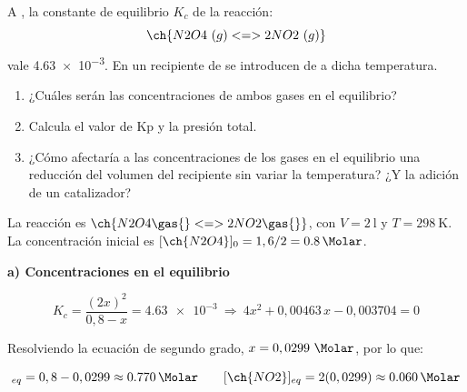 \begin{exerciseEVAU}
    A , la constante de equilibrio \(K_c\) de la reacción:
    \begin{equation*}
        \ch{N2O4\ (g)  <=> 2 NO2\ (g)}
    \end{equation*}
    vale \num{4,63e-3}.
    En un recipiente de  se introducen  de  a dicha temperatura.
    \begin{enumerate}[label=\letraminuscula]
\item ¿Cuáles serán las concentraciones de ambos gases en el equilibrio?
\item Calcula el valor de Kp y la presión total.
\item ¿Cómo afectaría a las concentraciones de los gases en el equilibrio una reducción del volumen del recipiente sin variar la temperatura? ¿Y la adición de un catalizador?
    \end{enumerate}


    \begin{solu}

        La reacción es \(\ch{N2O4 \gas{} <=> 2 NO2 \gas{}}\), con \(V = \SI{2}{\litre}\) y \(T = \SI{298}{\kelvin}\). La concentración inicial es \([\ch{N2O4}]_0 = 1,6/2 = \SI{0.8}{\Molar}\).

        \textbf{a) Concentraciones en el equilibrio}

        \begin{equation*}
            K_c = \dfrac{(2x)^2}{0,8-x} = \num{4.63e-3} \ \Rightarrow \ 4x^2 + 0,00463\, x - 0,003704 = 0
        \end{equation*}

        Resolviendo la ecuación de segundo grado, \(x = 0,0299\ \si{\Molar}\), por lo que:

        \begin{equation*}
            [\ch{N2O4}]_{eq} = 0,8 - 0,0299 \approx \SI{0.770}{\Molar} \qquad [\ch{NO2}]_{eq} = 2(0,0299) \approx \SI{0.060}{\Molar}
        \end{equation*}


\end{solu}
\end{exerciseEVAU}
